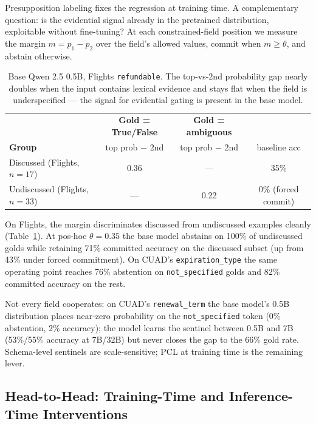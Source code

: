 \documentclass{article}
\begin{document}
Presupposition labeling fixes the regression at training time. A complementary question: is the evidential signal already in the pretrained distribution, exploitable without fine-tuning? At each constrained-field position we measure the margin $m = p_1 - p_2$ over the field's allowed values, commit when $m \ge \theta$, and abstain otherwise.

\begin{table}[h]
\centering
\small
\begin{tabular}{lccc}
\toprule
 & \textbf{Gold = True/False} & \textbf{Gold = ambiguous} & \\
\textbf{Group} & top prob $-$ 2nd & top prob $-$ 2nd & baseline acc \\
\midrule
Discussed (Flights, $n=17$) & 0.36 & --- & 35\% \\
Undiscussed (Flights, $n=33$) & --- & 0.22 & 0\% (forced commit) \\
\bottomrule
\end{tabular}
\caption{Base Qwen 2.5 0.5B, Flights \texttt{refundable}. The top-vs-2nd probability gap nearly doubles when the input contains lexical evidence and stays flat when the field is underspecified --- the signal for evidential gating is present in the base model.}
\label{tab:gating_flights}
\end{table}

On Flights, the margin discriminates discussed from undiscussed examples cleanly (Table~\ref{tab:gating_flights}). At pos-hoc $\theta = 0.35$ the base model abstains on 100\% of undiscussed golds while retaining 71\% committed accuracy on the discussed subset (up from 43\% under forced commitment). On CUAD's \texttt{expiration\_type} the same operating point reaches 76\% abstention on \texttt{not\_specified} golds and 82\% committed accuracy on the rest.

Not every field cooperates: on CUAD's \texttt{renewal\_term} the base model's 0.5B distribution places near-zero probability on the \texttt{not\_specified} token (0\% abstention, 2\% accuracy); the model learns the sentinel between 0.5B and 7B (53\%/55\% accuracy at 7B/32B) but never closes the gap to the 66\% gold rate. Schema-level sentinels are scale-sensitive; PCL at training time is the remaining lever.

\subsection{Head-to-Head: Training-Time and Inference-Time Interventions}\label{sec:head_to_head}
\end{document}
